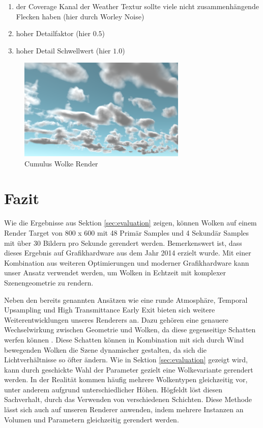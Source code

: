 \begin{enumerate}
    \item der Coverage Kanal der Weather Textur sollte viele nicht zusammenhängende Flecken haben (hier durch Worley Noise)
    \item hoher Detailfaktor (hier $ 0.5 $)
    \item hoher Detail Schwellwert (hier $ 1.0 $)
\end{enumerate}

\begin{figure}[H]
    \centering
    \includegraphics[width=8cm]{media/cumulus.png}
    \caption{Cumulus Wolke Render}
    \label{fig:cumulus}
\end{figure}

\section{Fazit}
\label{sec:conclusion}

Wie die Ergebnisse aus Sektion \ref{sec:evaluation} zeigen, können Wolken auf einem Render Target von 800 x 600 mit 48 Primär Samples und 4 Sekundär Samples mit  über 30 Bildern pro Sekunde gerendert werden. Bemerkenswert ist, dass dieses Ergebnis auf Grafikhardware aus dem Jahr 2014 erzielt wurde. Mit einer Kombination aus weiteren Optimierungen und moderner Grafikhardware kann unser Ansatz verwendet werden, um Wolken in Echtzeit mit komplexer Szenengeometrie zu rendern.

Neben den bereits genannten Ansätzen wie eine runde Atmosphäre, Temporal Upsampling und High Transmittance Early Exit bieten sich weitere Weiterentwicklungen unseres Renderers an. Dazu gehören eine genauere Wechselwirkung zwischen Geometrie und Wolken, da diese gegenseitige Schatten werfen können \cite{Högfeldt16}. Diese Schatten können in Kombination mit sich durch Wind bewegenden Wolken die Szene dynamischer gestalten, da sich die Lichtverhältnisse so öfter ändern. Wie in Sektion \ref{sec:evaluation} gezeigt wird, kann durch geschickte Wahl der Parameter gezielt eine Wolkevariante gerendert werden. In der Realität kommen häufig mehrere Wolkentypen gleichzeitig vor, unter anderem aufgrund unterschiedlicher Höhen. Högfeldt \cite{Högfeldt16} löst diesen Sachverhalt, durch das Verwenden von verschiedenen Schichten. Diese Methode lässt sich auch auf unseren Renderer anwenden, indem mehrere Instanzen an Volumen und Parametern gleichzeitig gerendert werden.

\clearpage
